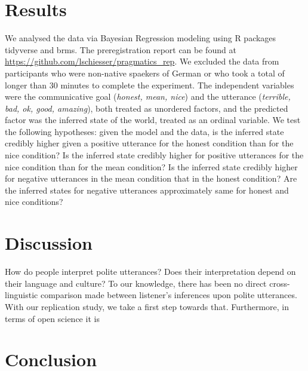 \documentclass[a4paper,11pt]{article}
\begin{document}
\section{Results}
We analysed the data via Bayesian Regression modeling using R packages tidyverse and brms. The preregistration report can be found at \url{https://github.com/lschiesser/pragmatics_rep}.  We excluded the data from participants who were non-native spaekers of German or who took a total of longer than 30 minutes to complete the experiment. The independent variables were the communicative goal (\textit{honest, mean, nice}) and the utterance (\textit{terrible, bad, ok, good, amazing}), both treated as unordered factors, and the predicted factor was the inferred state of the world, treated as an ordinal variable. We test the following hypotheses: given the model and the data, is the inferred state credibly higher given a positive utterance for the honest condition than for the nice condition? Is the inferred state credibly higher for positive utterances for the nice condition than for the mean condition? Is the inferred state credibly higher for negative utterances in the mean condition that in the honest condition? Are the inferred states for negative utterances approximately same for honest and nice conditions? 

\section{Discussion}
How do people interpret polite utterances? Does their interpretation depend on their language and culture? To our knowledge, there has been no direct cross-linguistic comparison made between listener's inferences upon polite utterances. With our replication study, we take a first step towards that. Furthermore, in terms of open science it is 
\section{Conclusion}



\end{document}
